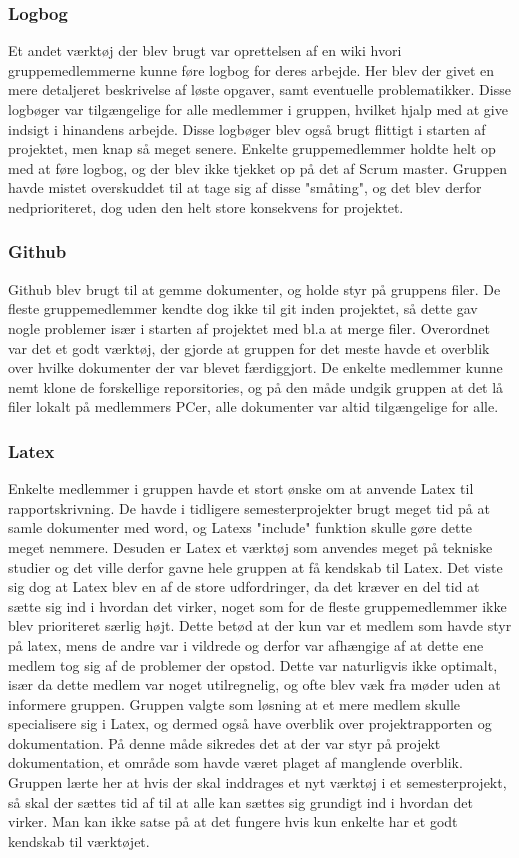 \subsubsection{Logbog}
Et andet værktøj der blev brugt var oprettelsen af en wiki hvori gruppemedlemmerne kunne føre logbog for deres arbejde. Her blev der givet en mere detaljeret beskrivelse af løste opgaver, samt eventuelle problematikker. Disse logbøger var tilgængelige for alle medlemmer i gruppen, hvilket hjalp med at give indsigt i hinandens arbejde. Disse logbøger blev også brugt flittigt i starten af projektet, men knap så meget senere. Enkelte gruppemedlemmer holdte helt op med at føre logbog, og der blev ikke tjekket op på det af Scrum master. Gruppen havde mistet overskuddet til at tage sig af disse "småting", og det blev derfor
nedprioriteret, dog uden den helt store konsekvens for projektet.

\subsubsection{Github}
Github blev brugt til at gemme dokumenter, og holde styr på gruppens filer. De fleste gruppemedlemmer kendte dog ikke til git inden projektet, 
så dette gav nogle problemer især i starten af projektet med bl.a at merge filer. Overordnet var det et godt værktøj, der gjorde at gruppen for det meste havde et overblik over hvilke dokumenter der var blevet færdiggjort. De enkelte medlemmer kunne nemt klone de forskellige reporsitories, og på den måde undgik gruppen at det lå filer lokalt på medlemmers PCer, alle dokumenter var altid tilgængelige for alle.  

\subsubsection{Latex}
Enkelte medlemmer i gruppen havde et stort ønske om at anvende Latex til rapportskrivning. De havde i tidligere semesterprojekter brugt meget tid på at samle dokumenter med word, og Latexs "include" funktion skulle gøre dette meget nemmere. Desuden er Latex et værktøj som anvendes meget på tekniske studier og det ville derfor gavne hele gruppen at få kendskab til Latex. Det viste sig dog at Latex blev en af de store udfordringer, da det kræver en del tid at sætte sig ind i hvordan det virker, noget som for de fleste gruppemedlemmer ikke blev prioriteret særlig højt. Dette betød at der kun var et medlem som havde styr på latex, mens de andre var i vildrede og derfor var afhængige af at dette ene medlem tog sig af de problemer der opstod. Dette var naturligvis ikke optimalt, især da dette medlem var noget utilregnelig, og ofte blev væk fra møder uden at informere gruppen. Gruppen valgte som løsning at et mere medlem skulle specialisere sig i Latex, og dermed også have overblik over projektrapporten og dokumentation. På denne måde sikredes det at der var styr på projekt dokumentation, et område som havde været plaget af manglende overblik. Gruppen lærte her at hvis der skal inddrages et nyt værktøj i et semesterprojekt, så skal der sættes tid af til at alle kan sættes sig grundigt ind i hvordan det virker. Man kan ikke satse på at det fungere hvis kun enkelte har et godt kendskab til værktøjet. 

